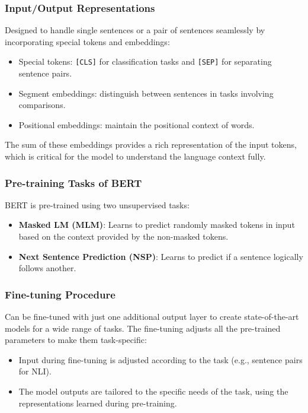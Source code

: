 \documentclass[11pt,xcolor={dvipsnames},hyperref={pdftex,pdfpagemode=UseNone,hidelinks,pdfdisplaydoctitle=true},usepdftitle=false]{beamer}
\begin{document}
\begin{frame}
\frametitle{Input/Output Representations}
Designed to handle single sentences or a pair of sentences seamlessly by incorporating special tokens and embeddings:
\begin{itemize}
    \item Special tokens: {\tt [CLS]} for classification tasks and {\tt [SEP]} for separating sentence pairs.
    \item Segment embeddings: distinguish between sentences in tasks involving comparisons.
    \item Positional embeddings: maintain the positional context of words.
\end{itemize}
The sum of these embeddings provides a rich representation of the input tokens, which is critical for the model to understand the language context fully.
\end{frame}

\begin{frame}
\frametitle{Pre-training Tasks of BERT}
BERT is pre-trained using two unsupervised tasks:
\begin{itemize}
    \item \textbf{Masked LM (MLM)}: Learns to predict randomly masked tokens in input based on the context provided by the non-masked tokens.
    \item \textbf{Next Sentence Prediction (NSP)}: Learns to predict if a sentence logically follows another.
\end{itemize}
\end{frame}

\begin{frame}
\frametitle{Fine-tuning Procedure}
Can be fine-tuned with just one additional output layer to create state-of-the-art models for a wide range of tasks. The fine-tuning adjusts all the pre-trained parameters to make them task-specific:
\begin{itemize}
    \item Input during fine-tuning is adjusted according to the task (e.g., sentence pairs for NLI).
    \item The model outputs are tailored to the specific needs of the task, using the representations learned during pre-training.
\end{itemize}
\end{frame}
    
\end{document}
